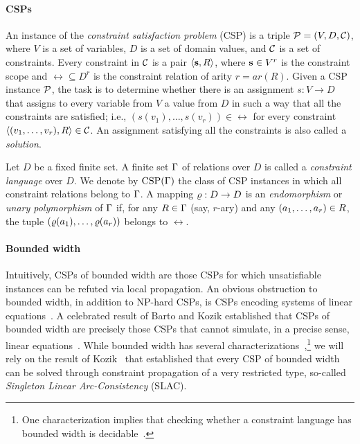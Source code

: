 
\paragraph{CSPs}
%
An instance of the \emph{constraint satisfaction problem} (CSP) is a triple
${\mathcal P}=(V,D,{\mathcal C})$, where $V$ is a set of variables, $D$ is a set of domain values,
and ${\mathcal C}$ is a set of constraints. Every constraint in ${\mathcal C}$ is a pair
$\langle {\bf s},R \rangle$, where ${\bf s}\in V^r$ is the constraint scope and $\rel\subseteq
D^r$ is the constraint relation of arity $r=ar(R)$. Given a CSP instance ${\mathcal P}$, the
task is to determine whether there is an assignment $s:V\to D$ that assigns to
every variable from $V$ a value from $D$ in such a way that
all the constraints are satisfied; i.e.,
$(s(v_1),\ldots,s(v_r))\in\rel$ for every constraint
$\langle (v_1,\ldots,v_r),R \rangle\in{\mathcal C}$. An assignment satisfying all the
constraints is also called a \emph{solution}.

Let $D$ be a fixed finite set. A finite set $\Gamma$ of relations over $D$ is
called a \emph{constraint language} over $D$. We denote by ${\rm CSP}(\Gamma)$ the
class of CSP instances in which all constraint relations belong to $\Gamma$. A mapping $\varrho:D\to D$ is an \emph{endomorphism} or \emph{unary polymorphism} of $\Gamma$ if, for any $R\in\Gamma$ (say, $r$-ary) and any $(a _1,\ldots, a _{r})\in R$, the tuple $(\varrho(a_1),\ldots,\varrho(a_r))$ belongs to $\rel$.

\paragraph{Bounded width}

Intuitively, CSPs of bounded width are those CSPs  for which unsatisfiable
instances can be refuted via local propagation. An obvious obstruction to bounded width, in
addition to NP-hard CSPs, is CSPs encoding systems of linear
equations~\cite{Feder98:monotone}. A celebrated result of Barto and Kozik
established that CSPs of bounded width are precisely those CSPs that cannot
simulate, in a precise sense, linear equations~\cite{Barto14:local}. 
While bounded width has several
characterizations~\cite{LaroseZadori07:au,Maroti2008existence,Bulatov09:width,Barto14:local,Kozik15:au},\footnote{One characterization implies that checking whether a constraint language has bounded
width is decidable~\cite{Kozik15:au}.} we will rely on the result of
Kozik~\cite{Kozik21:sicomp} that established that every CSP of bounded width can
be solved through constraint propagation of a very restricted type, so-called
\emph{Singleton Linear Arc-Consistency} (SLAC). 

